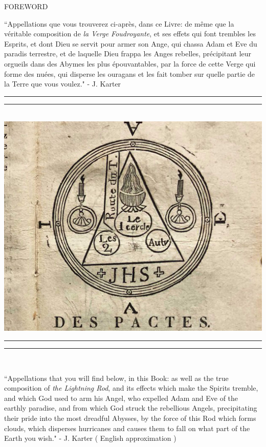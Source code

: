 \documentclass[11pt]{article}
\begin{document}
\begin{center}
\huge FOREWORD
\end{center}

\begingroup
\begin{center}
``Appellations que vous trouverez ci-après, dans ce Livre: de même que la véritable composition de \textit{la Verge Foudroyante}, et ses effets qui font trembles les Esprits, et dont Dieu se servit pour armer son Ange, qui chassa Adam et Eve du paradis terrestre, et de laquelle Dieu frappa les Anges rebelles, précipitant leur orgueils dans des Abymes les plus épouvantables, par la force de cette Verge qui forme des nuées, qui disperse les ouragans et les fait tomber sur quelle partie de la Terre que vous voulez."
\rightskip\leftskip
\phantom{text} \hfill - J. Karter
\end{center}
\endgroup


\begingroup
\begin{center}
\rule{\textwidth}{1.6pt}\vspace*{-\baselineskip}\vspace*{1pt}
\rule{\textwidth}{0.4pt}\\[\baselineskip]
\includegraphics[scale=0.20]{verge.jpeg}
\rule{\textwidth}{0.4pt}\vspace*{-\baselineskip}\vspace{2pt}
\rule{\textwidth}{1.6pt}\\[\baselineskip]
\end{center}
\endgroup

\begingroup
\begin{center}
``Appellations that you will find below, in this Book: as well as the true composition of \textit{the Lightning Rod}, and its effects which make the Spirits tremble, and which God used to arm his Angel, who expelled Adam and Eve of the earthly paradise, and from which God struck the rebellious Angels, precipitating their pride into the most dreadful Abysses, by the force of this Rod which forms clouds, which disperses hurricanes and causes them to fall on what part of the Earth you wish."
\rightskip\leftskip
\phantom{text} \hfill - J. Karter ( English approximation )
\end{center}
\endgroup
\end{document}
